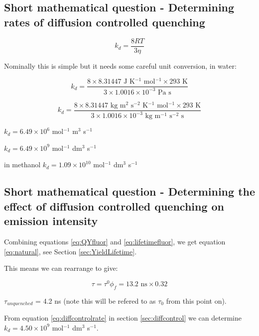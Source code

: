 \documentclass[
]{book}
\begin{document}
\hypertarget{sec:diffcontrolans}{%
\subsection{Short mathematical question - Determining rates of diffusion controlled quenching}\label{sec:diffcontrolans}}

\begin{equation}
k_d = \frac{8RT}{3 \eta}
\label{eq:diffcontrolrate}
\end{equation}

Nominally this is simple but it needs some careful unit conversion, in water:

\begin{equation*}
k_d = \frac{8 \times 8.31447 \textrm { J K$^{-1}$ mol$^{-1}$} \times 293 \textrm{ K}}{3 \times 1.0016 \times 10^{-3} \textrm{ Pa s}}
\end{equation*}

\begin{equation*}
k_d = \frac{8 \times 8.31447 \textrm { kg m$^2$ s$^{-2}$ K$^{-1}$ mol$^{-1}$} \times 293 \textrm{ K}}{3 \times 1.0016 \times 10^{-3} \textrm{ kg m$^{-1}$ s$^{-2}$ s}}
\end{equation*}

\(k_d= 6.49 \times 10^6\) mol\(^{-1}\) m\(^3\) s\(^{-1}\)

\(k_d= 6.49 \times 10^9\) mol\(^{-1}\) dm\(^3\) s\(^{-1}\)

in methanol \(k_d= 1.09 \times 10^{10}\) mol\(^{-1}\) dm\(^3\) s\(^{-1}\)

\hypertarget{sec:emintquenchans}{%
\subsection{Short mathematical question - Determining the effect of diffusion controlled quenching on emission intensity}\label{sec:emintquenchans}}

Combining equations \eqref{eq:QYfluor} and \eqref{eq:lifetimefluor}, we get equation \eqref{eq:natural}, see Section \ref{sec:YieldLifetime}.

This means we can rearrange to give:

\begin{equation*}
\tau = \tau^0 \phi_f = 13.2 \textrm{ ns} \times 0.32
\end{equation*}

\(\tau_{unquenched}\) = 4.2 ns (note this will be refered to as \(\tau_0\) from this point on).

From equation \eqref{eq:diffcontrolrate} in section \ref{sec:diffcontrol} we can determine \(k_d = 4.50 \times 10^9\) mol\(^{-1}\) dm\(^3\) s\(^{-1}\).
\end{document}
